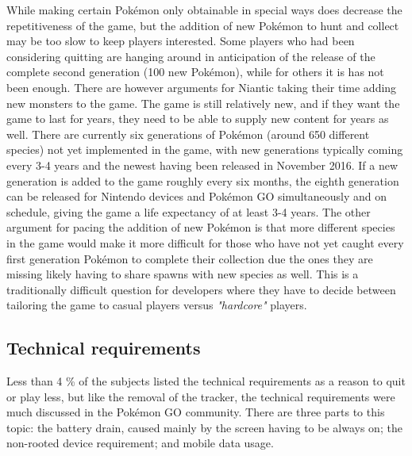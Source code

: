 While making certain Pokémon only obtainable in special ways does decrease the repetitiveness of the game, but the addition of new Pokémon to hunt and collect may be too slow to keep players interested. Some players who had been considering quitting are hanging around in anticipation of the release of the complete second generation (100 new Pokémon), while for others it is has not been enough. There are however arguments for Niantic taking their time adding new monsters to the game. The game is still relatively new, and if they want the game to last for years, they need to be able to supply new content for years as well. There are currently six generations of Pokémon (around 650 different species) not yet implemented in the game, with new generations typically coming every 3-4 years and the newest having been released in November 2016. If a new generation is added to the game roughly every six months, the eighth generation can be released for Nintendo devices and Pokémon GO simultaneously and on schedule, giving the game a life expectancy of at least 3-4 years. The other argument for pacing the addition of new Pokémon is that more different species in the game would make it more difficult for those who have not yet caught every first generation Pokémon to complete their collection due the ones they are missing likely having to share spawns with new species as well. This is a traditionally difficult question for developers where they have to decide between tailoring the game to casual players versus \emph{"hardcore"} players.

\subsection{Technical requirements}
\label{sec:quitting-reasons-technical-requirements}
Less than 4 \% of the subjects listed the technical requirements as a reason to quit or play less, but like the removal of the tracker, the technical requirements were much discussed in the Pokémon GO community. There are three parts to this topic: the battery drain, caused mainly by the screen having to be always on; the non-rooted device requirement; and mobile data usage.

